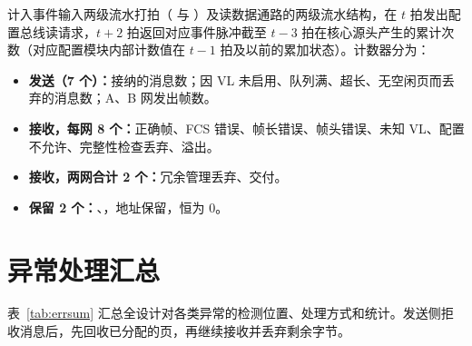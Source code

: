 计入事件输入两级流水打拍（ 与 ）及读数据通路的两级流水结构，在 $t$ 拍发出配置总线读请求，$t+2$ 拍返回对应事件脉冲截至 $t-3$ 拍在核心源头产生的累计次数（对应配置模块内部计数值在 $t-1$ 拍及以前的累加状态）。计数器分为：
\begin{itemize}
  \item \textbf{发送（7 个）：}接纳的消息数；因 VL 未启用、队列满、超长、无空闲页而丢弃的消息数；A、B 网发出帧数。
  \item \textbf{接收，每网 8 个：}正确帧、FCS 错误、帧长错误、帧头错误、未知 VL、配置不允许、完整性检查丢弃、溢出。
  \item \textbf{接收，两网合计 2 个：}冗余管理丢弃、交付。
  \item \textbf{保留 2 个：}、，地址保留，恒为 0。
\end{itemize}

\section{异常处理汇总}\label{sec:errsum}

表~\ref{tab:errsum} 汇总全设计对各类异常的检测位置、处理方式和统计。发送侧拒收消息后，先回收已分配的页，再继续接收并丢弃剩余字节。

